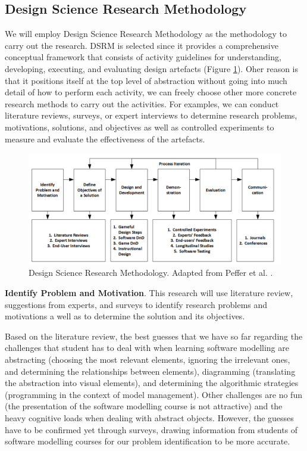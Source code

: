 \documentclass[12pt, a4paper]{report}
\begin{document}
{\subsection{Design Science Research Methodology}
We will employ Design Science Research Methodology \cite{peffers2007design} as the methodology to carry out the research. DSRM is selected since it provides a comprehensive conceptual framework that consists of activity guidelines for understanding, developing, executing, and evaluating design artefacts (Figure \ref{dsrm}). Oher reason is that it positions itself at the top level of abstraction without going into much detail of how to perform each activity, we can freely choose other more concrete research methods to carry out the activities. For examples, we can conduct literature reviews, surveys, or expert interviews to determine research problems, motivations, solutions, and objectives as well as controlled experiments to measure and evaluate the effectiveness of the artefacts. 

\begin{figure}[ht]
\centering
\includegraphics[width=\textwidth]{dsrm}
\caption{Design Science Research Methodology. Adapted from Peffer et al. \cite{peffers2007design}.}
\label{dsrm}
\end{figure}

\textbf{Identify Problem and Motivation}. This research will use literature review, suggestions from experts, and surveys to identify research problems and motivations a well as to determine the solution and its objectives.

Based on the literature review, the best guesses that we have so far regarding the challenges that student has to deal with when learning software modelling are abstracting (choosing the most relevant elements, ignoring the irrelevant ones, and determining the relationships between elements), diagramming (translating the abstraction into visual elements), and determining the algorithmic strategies (programming in the context of model management). Other challenges are no fun (the presentation of the software modelling course is not attractive) and the heavy cognitive loads when dealing with abstract objects. However, the guesses have to be confirmed yet through surveys, drawing information from students of software modelling courses for our problem identification to be more accurate.

}
\end{document}
